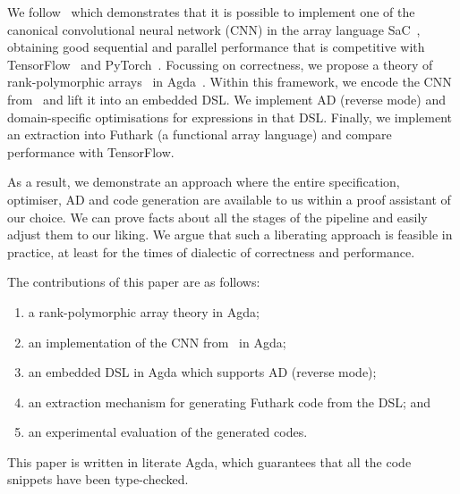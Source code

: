 We follow~\cite{cnn-array} which demonstrates that it is possible to implement
one of the canonical convolutional neural network (CNN) in the array
language SaC~\cite{sac1, sac2}, obtaining good sequential and parallel performance
that is competitive with TensorFlow~\cite{ad-tf} and PyTorch~\cite{ad-pytorch}.
Focussing on correctness, we propose
a theory of rank-polymorphic arrays~\cite{rank-poly} in Agda~\cite{agda-2-6-3}.
Within this framework, we encode the CNN from~\cite{cnn-array} and lift it 
into an embedded DSL.  We implement AD
(reverse mode) and domain-specific optimisations for expressions in that DSL.
Finally, we implement an extraction 
into Futhark (a functional array language) and compare performance with TensorFlow.

As a result, we demonstrate an approach where the entire specification,
optimiser, AD and code generation are available to us within a proof
assistant of our choice.  We can prove facts about all the
stages of the pipeline and easily adjust them to our liking.
We argue that such a liberating
approach is feasible in practice, at least for the times of dialectic
of correctness and performance.


The contributions of this paper are as follows:
\begin{enumerate}
  \item a rank-polymorphic array theory in Agda;
  \item an implementation of the CNN from~\cite{cnn-array} in Agda;
  \item an embedded DSL in Agda which supports AD (reverse mode);
  \item an extraction mechanism for generating Futhark code from the DSL; and
  \item an experimental evaluation of the generated codes.
\end{enumerate}

This paper is written in literate Agda, which guarantees that all the code
snippets have been type-checked.


